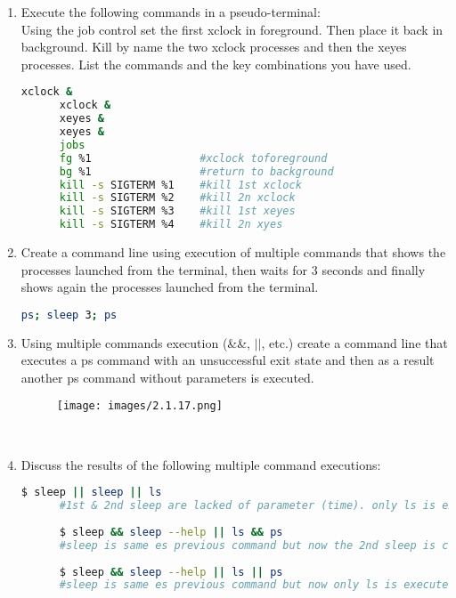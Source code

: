 \documentclass[12pt, titlepage,]{article}
\begin{document}
\begin{enumerate}
  \item Execute the following commands in a pseudo-terminal:\\
    Using the job control set the first xclock in foreground. Then place it back in background. Kill by name the two
    xclock processes and then the xeyes processes. List the commands and the key combinations you have used.
      \begin{lstlisting}[language=Bash]
      xclock &
      xclock &
      xeyes &
      xeyes &    
      jobs
      fg %1                 #xclock toforeground
      bg %1                 #return to background
      kill -s SIGTERM %1    #kill 1st xclock
      kill -s SIGTERM %2    #kill 2n xclock
      kill -s SIGTERM %3    #kill 1st xeyes
      kill -s SIGTERM %4    #kill 2n xyes
    \end{lstlisting}

  \item Create a command line using execution of multiple commands that shows the processes launched from the terminal, then waits for 3 seconds and finally shows again the processes launched from the terminal.
    \begin{lstlisting}[language=Bash]
    ps; sleep 3; ps
    \end{lstlisting}
    
  \item Using multiple commands execution (\&\&, $|  |$, etc.) create a command line that executes a ps command with an unsuccessful exit state and then as a result another ps command without parameters is executed. \\
     \begin{figure}[h] %
    \centering
    {\texttt{[image: images/2.1.17.png]}}
    \end{figure} \\
    
  \item Discuss the results of the following multiple command executions: 
      \begin{lstlisting}[language=Bash]
      $ sleep || sleep || ls                
      #1st & 2nd sleep are lacked of parameter (time). only ls is executed.
      
      $ sleep && sleep --help || ls && ps   
      #sleep is same es previous command but now the 2nd sleep is correct but there is the and condition, so only ls and ps are executed. 
      
      $ sleep && sleep --help || ls || ps
      #sleep is same es previous command but now only ls is executed because the condition is or.
      \end{lstlisting}
\end{enumerate}
\clearpage
\end{document}
